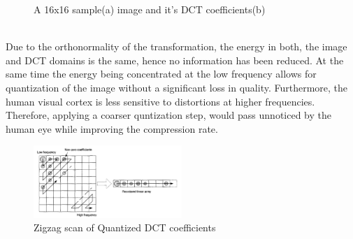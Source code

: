\documentclass[a4paper,11pt,oneside]{article}
\begin{document}
\begin{figure}[h]
    \centering
    \qquad
    \caption{A 16x16 sample(a) image and it's DCT coefficients(b) \cite[pp.~35]{richardson2002video}}
    \label{figure:DCTexample}
\end{figure}\\
\indent Due to the orthonormality of the transformation, the energy in both, the image and DCT domains is the same, hence no information has been reduced. At the same time the energy being concentrated at the low frequency allows for quantization of the image without a significant loss in quality. Furthermore, the human visual cortex is less sensitive to distortions at higher frequencies. Therefore, applying a coarser quntization step, would pass unnoticed by the human eye while improving the compression rate. \\
\begin{figure}
    \includegraphics[width=0.5\textwidth]{../figures/zigzag_reorder_QDCT.pdf}
    \caption{Zigzag scan of Quantized DCT coefficients \cite[pp.40]{richardson2002video}}
    \label{figure:zigzag_scan}
\end{figure}
\end{document}

